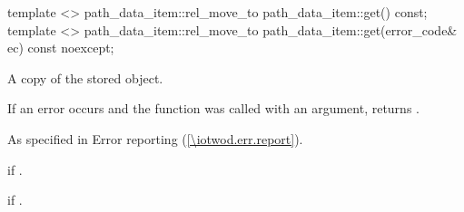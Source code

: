 \begin{itemdecl}
template <>
path_data_item::rel_move_to path_data_item::get() const;
template <>
path_data_item::rel_move_to path_data_item::get(error_code& ec) const noexcept;
\end{itemdecl}
\begin{itemdescr}
\pnum
\returns
A copy of the stored  object.

\pnum
If an error occurs and the function was called with an  argument, returns .

\pnum
\throws
As specified in Error reporting (\ref{\iotwod.err.report}).

\pnum
\errors
{} if .

\pnum
{} if .
\end{itemdescr}
